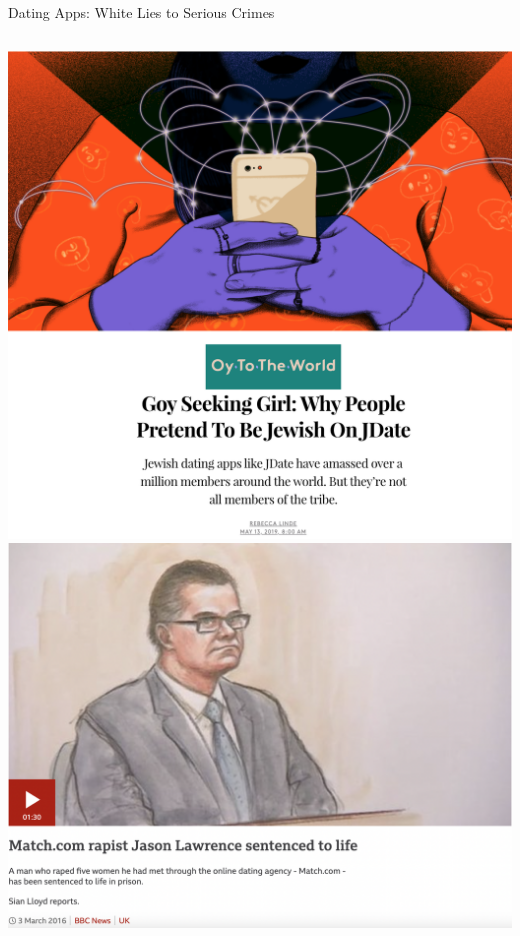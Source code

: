 \documentclass[nobackground,dvipsnames,table,aspectratio=169]{beamer}
\begin{document}
\begin{frame}{Dating Apps: White Lies to Serious Crimes}
    \begin{columns}
            \includegraphics[width=\textwidth]{dating-app-lies}
            \includegraphics[width=\textwidth]{dating-app-crimes}
    \end{columns}
\end{frame}
\end{document}
